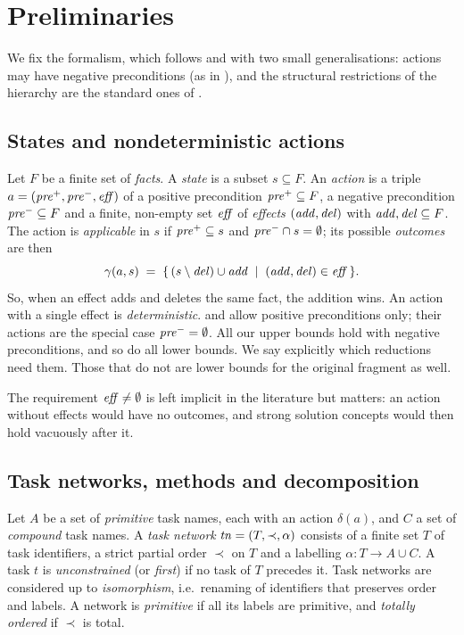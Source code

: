 \section{Preliminaries}\label{sec:prelim}

We fix the formalism, which follows \CBa{} and \CBb{} with two small generalisations: actions may
have negative preconditions (as in \DB{}), and the structural restrictions of the hierarchy are
the standard ones of \textcite{alford:et:al:icaps-15}.

\subsection{States and nondeterministic actions}

Let $F$ be a finite set of \emph{facts}. A \emph{state} is a subset $s\subseteq F$. An
\emph{action} is a triple $a=(\mathit{pre}^+,\mathit{pre}^-,\mathit{eff})$ of a positive precondition $\mathit{pre}^+\subseteq F$,
a negative precondition $\mathit{pre}^-\subseteq F$ and a finite, non-empty set $\mathit{eff}$ of
\emph{effects} $(\mathit{add},\mathit{del})$ with $\mathit{add},\mathit{del}\subseteq F$. The action is \emph{applicable} in $s$
if $\mathit{pre}^+\subseteq s$ and $\mathit{pre}^-\cap s=\emptyset$; its possible \emph{outcomes} are then
\[
  \gamma(a,s) \;=\; \{\, (s\setminus\mathit{del})\cup\mathit{add} \;\mid\; (\mathit{add},\mathit{del})\in\mathit{eff} \,\}.
\]
So, when an effect adds and deletes the same fact, the addition wins. An action with a single
effect is \emph{deterministic}. \CBa{} and \CBb{} allow positive preconditions only; their
actions are the special case $\mathit{pre}^-=\emptyset$. All our upper bounds hold with negative
preconditions, and so do all lower bounds. We say explicitly which reductions need them. Those that
do not are lower bounds for the original fragment as well.

The requirement $\mathit{eff}\neq\emptyset$ is left implicit in the literature but matters: an action
without effects would have no outcomes, and strong solution concepts would then hold vacuously
after it.

\subsection{Task networks, methods and decomposition}

Let $A$ be a set of \emph{primitive} task names, each with an action $\delta(a)$, and $C$ a set of
\emph{compound} task names. A \emph{task network} $\mathit{tn}=(T,\prec,\alpha)$ consists of a finite set
$T$ of task identifiers, a strict partial order ${\prec}$ on $T$ and a labelling
$\alpha:T\to A\cup C$. A task $t$ is \emph{unconstrained} (or \emph{first}) if no task of $T$
precedes it. Task networks are considered up to \emph{isomorphism}, i.e.\ renaming of
identifiers that preserves order and labels. A network is \emph{primitive} if all its labels are
primitive, and \emph{totally ordered} if ${\prec}$ is total.

